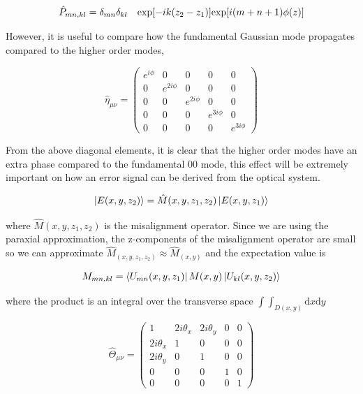 		\begin{equation}
		\hat{P}_{mn,kl} = \delta_{mn} \delta_{kl} \quad \text{exp}[-ik(z_2 - z_1)] 
		\\ \text{exp}[i(m+n+1)\phi(z)]
		\end{equation}

		However, it is useful to compare how the fundamental Gaussian mode propagates compared to the higher order modes,

		\begin{equation} \label{GouyPhaseMatrix}
		\hat{\eta}_{\mu \nu} = 
		\begin{pmatrix}
		e^{i\phi}	&0			&0			& 0 			& 0
		\\ 0		&e^{2i\phi}	&0			& 0				& 0
		\\ 0		&0			&e^{2i\phi}	& 0				& 0
		\\ 0		&0			&0			& e^{3i\phi}	& 0
		\\ 0		&0			&0			& 0				& e^{3i\phi}
		\end{pmatrix}
		\end{equation}

		From the above diagonal elements, it is clear that the higher order modes have an extra phase compared to the fundamental 00 mode, this effect will be extremely important on how an error signal can be derived from the optical system.
		
		\begin{equation}
		\ket{E(x,y,z_2)} = \hat{M}(x,y,z_1,z_2)	\ket{E(x,y,z_1)}
		\end{equation}
		
		where $\hat{M}(x,y,z_1,z_2)$ is the misalignment operator.  Since we are using the paraxial approximation, the z-components of the misalignment operator are small so we can approximate $\hat{M}_(x,y,z_1,z_2) \approx \hat{M}_(x,y)$ and the expectation value is
		
		\begin{equation}
		M_{mn,kl}=  \bra{U_{mn}(x,y,z_1)} M(x,y) \ket{U_{kl}(x,y,z_2)}
		\end{equation}

		where the product is an integral over the transverse space $\int \!\!\! \int_{D(x,y)} \text{d}x \text{d}y$

		\begin{equation} \label{misalign_matrix}
		\hat{\Theta}_{\mu \nu} = 
		\begin{pmatrix}
		   1			&2i\theta_x		&2i\theta_y		& 0 & 0
		\\ 2i\theta_x	&1				&0				& 0	& 0
		\\ 2i\theta_y	&0				&1				& 0	& 0
		\\ 0			&0				&0				& 1	& 0
		\\ 0			&0				&0				& 0	& 1
		\end{pmatrix}
		\end{equation}


